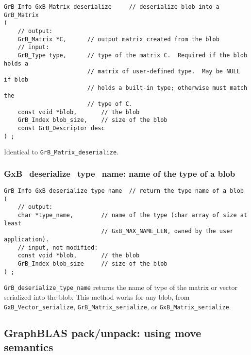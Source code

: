 \documentclass[12pt]{article}
\begin{document}
\begin{mdframed}[userdefinedwidth=6in]
{\footnotesize
\begin{verbatim}
GrB_Info GxB_Matrix_deserialize     // deserialize blob into a GrB_Matrix
(
    // output:
    GrB_Matrix *C,      // output matrix created from the blob
    // input:
    GrB_Type type,      // type of the matrix C.  Required if the blob holds a
                        // matrix of user-defined type.  May be NULL if blob
                        // holds a built-in type; otherwise must match the
                        // type of C.
    const void *blob,       // the blob
    GrB_Index blob_size,    // size of the blob
    const GrB_Descriptor desc
) ;
\end{verbatim}
} \end{mdframed}

Identical to \verb'GrB_Matrix_deserialize'.

\newpage
\subsubsection{{\sf GxB\_deserialize\_type\_name:} name of the type of a blob}
\label{deserialize_type_name}

\begin{mdframed}[userdefinedwidth=6in]
{\footnotesize
\begin{verbatim}
GrB_Info GxB_deserialize_type_name  // return the type name of a blob
(
    // output:
    char *type_name,        // name of the type (char array of size at least
                            // GxB_MAX_NAME_LEN, owned by the user application).
    // input, not modified:
    const void *blob,       // the blob
    GrB_Index blob_size     // size of the blob
) ;
\end{verbatim}
} \end{mdframed}

\verb'GrB_deserialize_type_name' returns the name of type of the matrix or
vector serialized into the blob.  This method works for any blob, from
\verb'GxB_Vector_serialize',
\verb'GrB_Matrix_serialize', or \verb'GxB_Matrix_serialize'.

\newpage
\subsection{GraphBLAS pack/unpack: using move semantics} %
\label{pack_unpack}
\end{document}
